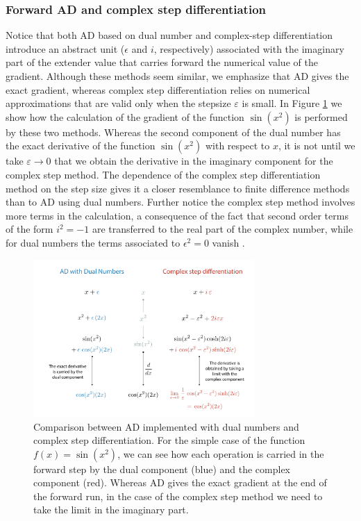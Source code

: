 \subsubsection{Forward AD and complex step differentiation}

Notice that both AD based on dual number and complex-step differentiation introduce an abstract unit ($\epsilon$ and $i$, respectively) associated with the imaginary part of the extender value that carries forward the numerical value of the gradient.
Although these methods seem similar, we emphasize that AD gives the exact gradient, whereas complex step differentiation relies on numerical approximations that are valid only when the stepsize $\varepsilon$ is small. 
In Figure \ref{fig:complex-step-AD} we show how the calculation of the gradient of the function $\sin (x^2)$ is performed by these two methods.
Whereas the second component of the dual number has the exact derivative of the function $\sin(x^2)$ with respect to $x$, it is not until we take $\varepsilon \rightarrow 0$ that we obtain the derivative in the imaginary component for the complex step method.
The dependence of the complex step differentiation method on the step size gives it a closer resemblance to finite difference methods than to AD using dual numbers.
Further notice the complex step method involves more terms in the calculation, a consequence of the fact that second order terms of the form $i^2 = -1$ are transferred to the real part of the complex number, while for dual numbers the terms associated to $\epsilon^2 = 0$ vanish \cite{martins2001connection}. 
\begin{figure}[t]
    \centering
    \includegraphics[width=0.75\textwidth]{tex/figures/complex-step-AD.pdf}
    \caption{Comparison between AD implemented with dual numbers and complex step differentiation. For the simple case of the function $f(x) = \sin(x^2)$, we can see how each operation is carried in the forward step by the dual component (blue) and the complex component (red). Whereas AD gives the exact gradient at the end of the forward run, in the case of the complex step method we need to take the limit in the imaginary part. }
    \label{fig:complex-step-AD}
\end{figure}


